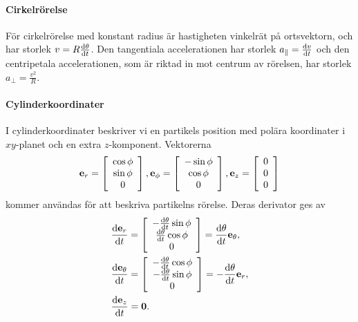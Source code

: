 \paragraph{Cirkelrörelse}
För cirkelrörelse med konstant radius är hastigheten vinkelrät på ortsvektorn, och har storlek $v = R\dv{\theta}{t}$. Den tangentiala accelerationen har storlek $a_{\parallel} = \dv{v}{t}$ och den centripetala accelerationen, som är riktad in mot centrum av rörelsen, har storlek $a_{\perp} = \frac{v^2}{R}$.

\paragraph{Cylinderkoordinater}
I cylinderkoordinater beskriver vi en partikels position med polära koordinater i $xy$-planet och en extra $z$-komponent. Vektorerna
\begin{align*}
	\vect{e}_{r} = 
	\left[\begin{array}{c}
		\cos{\phi} \\
		\sin{\phi} \\
		0
	\end{array}\right],
	\vect{e}_{\phi} = 
	\left[\begin{array}{c}
		-\sin{\phi} \\
		\cos{\phi} \\
		0
	\end{array}\right],
	\vect{e}_{z} = 
	\left[\begin{array}{c}
		0 \\
		0 \\
		0
	\end{array}\right]
\end{align*}
kommer användas för att beskriva partikelns rörelse. Deras derivator ges av
\begin{align*}
	&\dv{\vect{e}_{r}}{t} =
	\left[\begin{array}{c}
		-\dv{\theta}{t}\sin{\phi} \\
		\dv{\theta}{t}\cos{\phi} \\
		0
	\end{array}\right]
	= \dv{\theta}{t}\vect{e}_{\theta}, \\
	&\dv{\vect{e}_{\theta}}{t} =
	\left[\begin{array}{c}
		-\dv{\theta}{t}\cos{\phi} \\
		-\dv{\theta}{t}\sin{\phi} \\
		0
	\end{array}\right]
	= -\dv{\theta}{t}\vect{e}_{r}, \\
	&\dv{\vect{e}_{z}}{t} = \vect{0}.
\end{align*}

